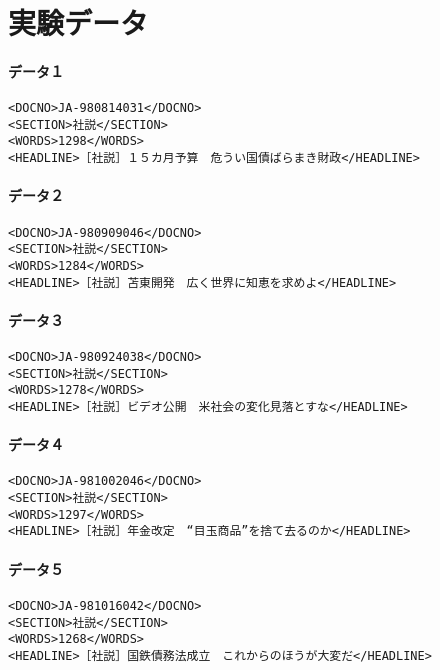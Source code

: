 \chapter{実験データ}
\label{app_a}

\subsubsection{データ１}

\begin{verbatim}
<DOCNO>JA-980814031</DOCNO>
<SECTION>社説</SECTION>
<WORDS>1298</WORDS>
<HEADLINE>［社説］１５カ月予算　危うい国債ばらまき財政</HEADLINE>
\end{verbatim}

\subsubsection{データ２}
\begin{verbatim}
<DOCNO>JA-980909046</DOCNO>
<SECTION>社説</SECTION>
<WORDS>1284</WORDS>
<HEADLINE>［社説］苫東開発　広く世界に知恵を求めよ</HEADLINE>
\end{verbatim}

\subsubsection{データ３}
\begin{verbatim}
<DOCNO>JA-980924038</DOCNO>
<SECTION>社説</SECTION>
<WORDS>1278</WORDS>
<HEADLINE>［社説］ビデオ公開　米社会の変化見落とすな</HEADLINE>
\end{verbatim}

\subsubsection{データ４}
\begin{verbatim}
<DOCNO>JA-981002046</DOCNO>
<SECTION>社説</SECTION>
<WORDS>1297</WORDS>
<HEADLINE>［社説］年金改定　“目玉商品”を捨て去るのか</HEADLINE>
\end{verbatim}

\subsubsection{データ５}
\begin{verbatim}
<DOCNO>JA-981016042</DOCNO>
<SECTION>社説</SECTION>
<WORDS>1268</WORDS>
<HEADLINE>［社説］国鉄債務法成立　これからのほうが大変だ</HEADLINE>
\end{verbatim}

